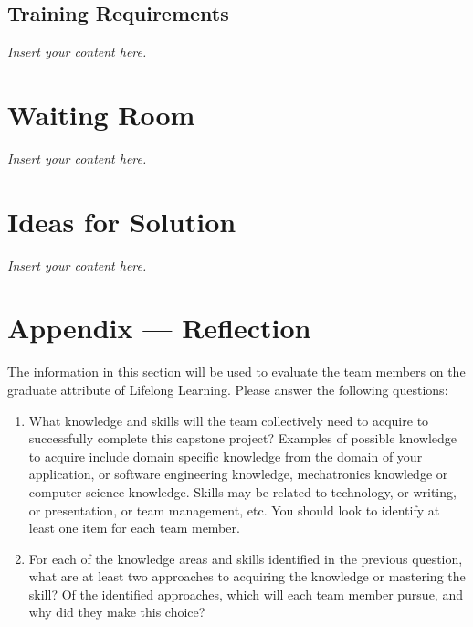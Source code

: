\documentclass[12pt]{article}
\newcommand{\lips}{\textit{Insert your content here.}}
\begin{document}
\subsection{Training Requirements}
\lips

\section{Waiting Room}
\lips

\section{Ideas for Solution}
\lips

\newpage{}
\section*{Appendix --- Reflection}

The information in this section will be used to evaluate the team members on the
graduate attribute of Lifelong Learning.  Please answer the following questions:

\begin{enumerate}
  \item What knowledge and skills will the team collectively need to acquire to
  successfully complete this capstone project?  Examples of possible knowledge
  to acquire include domain specific knowledge from the domain of your
  application, or software engineering knowledge, mechatronics knowledge or
  computer science knowledge.  Skills may be related to technology, or writing,
  or presentation, or team management, etc.  You should look to identify at
  least one item for each team member.
  \item For each of the knowledge areas and skills identified in the previous
  question, what are at least two approaches to acquiring the knowledge or
  mastering the skill?  Of the identified approaches, which will each team
  member pursue, and why did they make this choice?
\end{enumerate}
\end{document}
